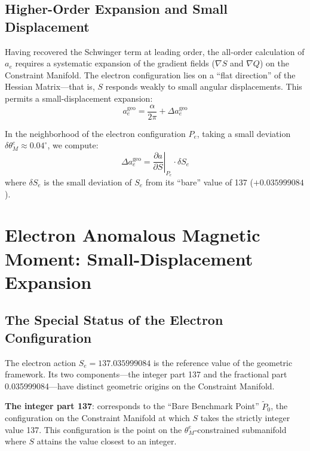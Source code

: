 \documentclass[aps,prd,reprint,nofootinbib]{revtex4-2}
\begin{document}
\subsection{Higher-Order Expansion and Small Displacement}

Having recovered the Schwinger term at leading order, the all-order calculation of $a_e$ requires a systematic expansion of the gradient fields ($\nabla S$ and $\nabla Q$) on the Constraint Manifold. The electron configuration lies on a ``flat direction'' of the Hessian Matrix---that is, $S$ responds weakly to small angular displacements. This permits a small-displacement expansion:
\begin{equation}
a_e^{\text{geo}} = \frac{\alpha}{2\pi} + \Delta a_e^{\text{geo}} \label{eq:expansion}
\end{equation}

In the neighborhood of the electron configuration $P_e$, taking a small deviation $\delta \theta_M^e \approx 0.04^\circ$, we compute:
\begin{equation}
\Delta a_e^{\text{geo}} = \left.\frac{\partial a}{\partial S}\right|_{P_e} \cdot \delta S_e \label{eq:delta_ae}
\end{equation}
where $\delta S_e$ is the small deviation of $S_e$ from its ``bare'' value of 137 ($+0.035999084$).

\section{Electron Anomalous Magnetic Moment: Small-Displacement Expansion}
\label{sec:electron}

\subsection{The Special Status of the Electron Configuration}

The electron action $S_e = 137.035999084$ is the reference value of the geometric framework. Its two components---the integer part 137 and the fractional part 0.035999084---have distinct geometric origins on the Constraint Manifold.

\textbf{The integer part 137}: corresponds to the ``Bare Benchmark Point'' $\tilde{P}_0$, the configuration on the Constraint Manifold at which $S$ takes the strictly integer value 137. This configuration is the point on the $\theta_M^e$-constrained submanifold where $S$ attains the value closest to an integer.
\end{document}

